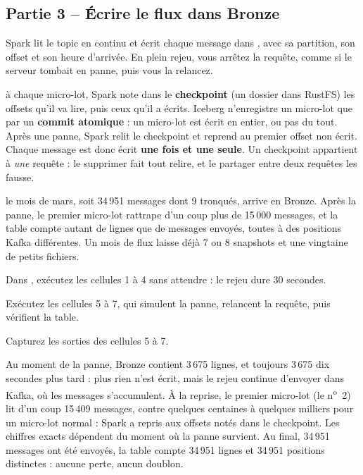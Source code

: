 \subsection*{Partie 3 -- Écrire le flux dans Bronze \hfill {}}

Spark lit le topic en continu et écrit chaque message dans , avec sa
partition, son offset et son heure d'arrivée. En plein rejeu, vous arrêtez la requête, comme si le
serveur tombait en panne, puis vous la relancez.

\begin{notion}
à chaque micro-lot, Spark note dans
le \textbf{checkpoint} (un dossier dans RustFS) les offsets qu'il va lire, puis ceux qu'il a écrits.
Iceberg n'enregistre un micro-lot que par un \textbf{commit atomique} : un micro-lot est écrit en
entier, ou pas du tout. Après une panne, Spark relit le checkpoint et reprend au premier offset non
écrit. Chaque message est donc écrit \textbf{une fois et une seule}. Un checkpoint appartient à
\emph{une} requête : le supprimer fait tout relire, et le partager entre deux requêtes les fausse.
\end{notion}

\begin{resultat}
le mois de mars, soit 34\,951 messages dont 9 tronqués, arrive en Bronze. Après la panne, le premier
micro-lot rattrape d'un coup plus de 15\,000 messages, et la table compte autant de lignes que de
messages envoyés, toutes à des positions Kafka différentes. Un mois de flux laisse déjà 7 ou 8
snapshots et une vingtaine de petits fichiers.
\end{resultat}

\begin{obtenir}
  \item Dans , exécutez les cellules 1 à 4 sans attendre : le rejeu dure 30 secondes.
  \item Exécutez les cellules 5 à 7, qui simulent la panne, relancent la requête, puis vérifient la table.
  \item Capturez les sorties des cellules 5 à 7.
\end{obtenir}
\begin{lecture}
Au moment de la panne, Bronze contient 3\,675 lignes, et toujours 3\,675 dix secondes plus tard :
plus rien n'est écrit, mais le rejeu continue d'envoyer dans Kafka, où les messages s'accumulent. À
la reprise, le premier micro-lot (le n\textsuperscript{o}~2) lit d'un coup 15\,409 messages, contre
quelques centaines à quelques milliers pour un micro-lot normal : Spark a repris aux offsets notés
dans le checkpoint. Les chiffres exacts dépendent du moment où la panne survient. Au final, 34\,951 messages ont été
envoyés, la table compte 34\,951 lignes et 34\,951 positions distinctes : aucune perte, aucun
doublon.
\end{lecture}


